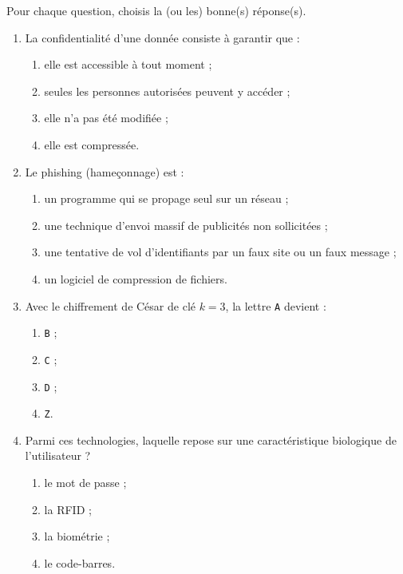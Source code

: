 \documentclass[11pt]{article}
\newcommand{\cle}[1]{{\popxbold\color{popdark}#1}}
\begin{document}
\begin{exercice}
Pour chaque question, choisis la (ou les) bonne(s) réponse(s).
\begin{enumerate}
\item La \cle{confidentialité} d'une donnée consiste à garantir que :
\begin{enumerate}
\item elle est accessible à tout moment ;
\item seules les personnes autorisées peuvent y accéder ;
\item elle n'a pas été modifiée ;
\item elle est compressée.
\end{enumerate}
\item Le \cle{phishing} (hameçonnage) est :
\begin{enumerate}
\item un programme qui se propage seul sur un réseau ;
\item une technique d'envoi massif de publicités non sollicitées ;
\item une tentative de vol d'identifiants par un faux site ou un faux message ;
\item un logiciel de compression de fichiers.
\end{enumerate}
\item Avec le chiffrement de César de clé $k = 3$, la lettre \texttt{A} devient :
\begin{enumerate}
\item \texttt{B} ; \item \texttt{C} ; \item \texttt{D} ; \item \texttt{Z}.
\end{enumerate}
\item Parmi ces technologies, laquelle repose sur une caractéristique biologique de l'utilisateur ?
\begin{enumerate}
\item le mot de passe ; \item la RFID ; \item la biométrie ; \item le code-barres.
\end{enumerate}
\end{enumerate}
\end{exercice}
\end{document}
